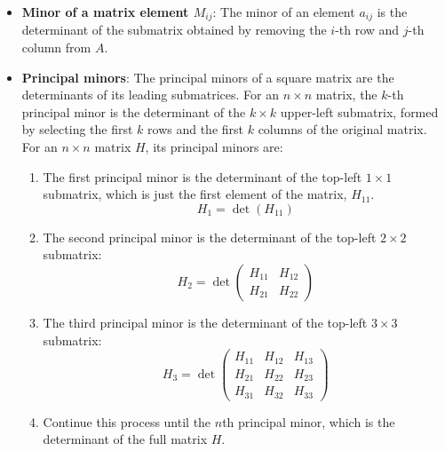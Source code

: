 \documentclass{report}
\begin{document}
\begin{itemize}
            \item \textbf{Minor of a matrix element $M_{ij} $}: The minor of an element $a_{ij}$ is the determinant of the submatrix obtained by removing the $i$-th row and $j$-th column from $A$.
            \item \textbf{Principal minors}: The principal minors of a square matrix are the determinants of its leading submatrices. For an $n \times n$ matrix, the $k$-th principal minor is the determinant of the $k \times k$ upper-left submatrix, formed by selecting the first $k$ rows and the first $k$ columns of the original matrix.
                \bigbreak \noindent 
                For an $n \times n$ matrix $H$, its principal minors are:
                \begin{enumerate}
                    \item The first principal minor is the determinant of the top-left $1 \times 1$ submatrix, which is just the first element of the matrix, $H_{11}$.
                    \[
                        H_1 = \det(H_{11})
                    \]
                    \item The second principal minor is the determinant of the top-left $2 \times 2$ submatrix:
                    \[
                        H_2 = \det\begin{pmatrix}
                            H_{11} & H_{12} \\
                            H_{21} & H_{22}
                        \end{pmatrix}
                    \]
                \item The third principal minor is the determinant of the top-left $3 \times 3$ submatrix:
                    \[
                        H_3 = \det\begin{pmatrix}
                            H_{11} & H_{12} & H_{13} \\
                            H_{21} & H_{22} & H_{23} \\
                            H_{31} & H_{32} & H_{33}
                        \end{pmatrix}
                    \]
                \item Continue this process until the $n$th principal minor, which is the determinant of the full matrix $H$.
                \end{enumerate}


\end{itemize}
\end{document}
